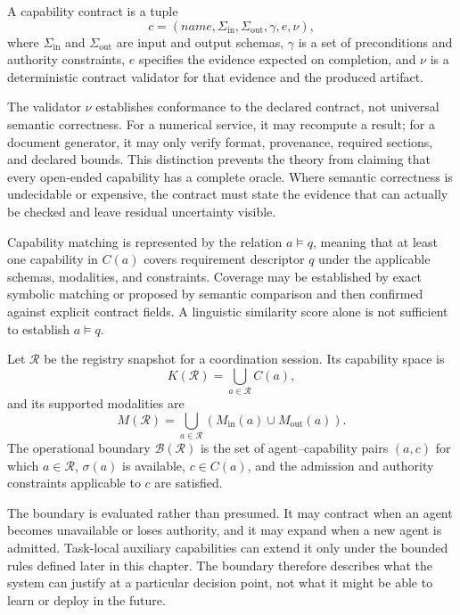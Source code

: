 \begin{definition}
\label{def:capability}
A capability contract is a tuple
\[
c = (\mathit{name}, \Sigma_{\mathrm{in}}, \Sigma_{\mathrm{out}}, \gamma, e, \nu),
\]
where $\Sigma_{\mathrm{in}}$ and $\Sigma_{\mathrm{out}}$ are input and output schemas, $\gamma$ is a set of preconditions and authority constraints, $e$ specifies the evidence expected on completion, and $\nu$ is a deterministic contract validator for that evidence and the produced artifact.
\end{definition}

The validator $\nu$ establishes conformance to the declared contract, not universal semantic correctness. For a numerical service, it may recompute a result; for a document generator, it may only verify format, provenance, required sections, and declared bounds. This distinction prevents the theory from claiming that every open-ended capability has a complete oracle. Where semantic correctness is undecidable or expensive, the contract must state the evidence that can actually be checked and leave residual uncertainty visible.

Capability matching is represented by the relation $a \models q$, meaning that at least one capability in $C(a)$ covers requirement descriptor $q$ under the applicable schemas, modalities, and constraints. Coverage may be established by exact symbolic matching or proposed by semantic comparison and then confirmed against explicit contract fields. A linguistic similarity score alone is not sufficient to establish $a \models q$.

\begin{definition}
\label{def:boundary}
Let $\mathcal{R}$ be the registry snapshot for a coordination session. Its capability space is
\[
K(\mathcal{R}) = \bigcup_{a \in \mathcal{R}} C(a),
\]
and its supported modalities are
\[
M(\mathcal{R}) = \bigcup_{a \in \mathcal{R}}
\left(M_{\mathrm{in}}(a) \cup M_{\mathrm{out}}(a)\right).
\]
The operational boundary $\mathcal{B}(\mathcal{R})$ is the set of agent--capability pairs $(a,c)$ for which $a \in \mathcal{R}$, $\sigma(a)$ is available, $c \in C(a)$, and the admission and authority constraints applicable to $c$ are satisfied.
\end{definition}

The boundary is evaluated rather than presumed. It may contract when an agent becomes unavailable or loses authority, and it may expand when a new agent is admitted. Task-local auxiliary capabilities can extend it only under the bounded rules defined later in this chapter. The boundary therefore describes what the system can justify at a particular decision point, not what it might be able to learn or deploy in the future.

